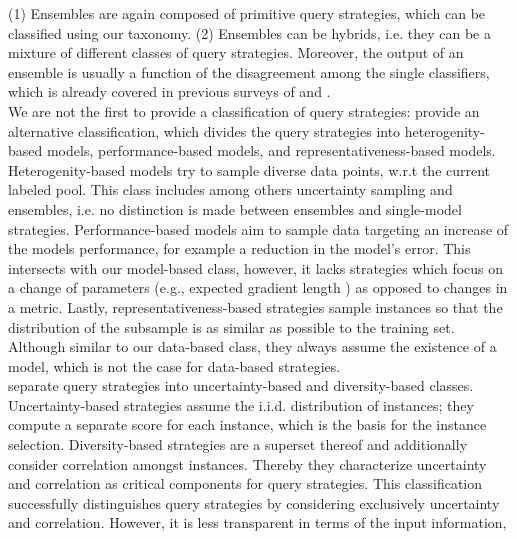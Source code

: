 (1) Ensembles are again composed of primitive query strategies, which can be classified using our taxonomy.
(2) Ensembles can be hybrids, i.e. they can be a mixture of different classes of query strategies.
Moreover, the output of an ensemble is usually a function of the disagreement among the single classifiers, which is already covered in previous surveys of \textcite{olsson2009literature} and \textcite{fu2013survey}.\\
\noindent We are not the first to provide a classification of query strategies: \textcite{aggarwal2014active} provide an alternative classification, which divides the query strategies into heterogenity-based models, 
performance-based models, and representativeness-based models.
Heterogenity-based models try to sample diverse data points, w.r.t the current labeled pool. This class includes among others uncertainty sampling and ensembles, i.e. no distinction is made between ensembles and single-model strategies. 
Performance-based models aim to sample data targeting an increase of the models performance, for example a reduction in the model's error.  
This intersects with our model-based class, however, it lacks strategies which focus on a change of parameters (e.g., expected gradient length ) as opposed to changes in a metric.
Lastly, representativeness-based strategies sample instances so that the distribution of the subsample is as similar as possible to the training set.
Although similar to our data-based class, they always assume the existence of a model, which is not the case for data-based strategies.\\
\pindent \textcite{fu2013survey} separate query strategies into 
uncertainty-based and diversity-based classes. 
Uncertainty-based strategies assume the i.i.d. distribution of instances; they compute a separate score for each instance, which is the basis for the instance selection.
Diversity-based strategies are a superset thereof and additionally consider correlation amongst instances.
Thereby they characterize uncertainty and correlation as critical components for query strategies.
This classification successfully distinguishes query strategies by considering exclusively uncertainty and correlation.
However, it is less transparent in terms of the input information, 
